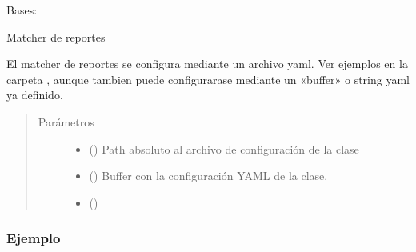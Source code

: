 \documentclass[a4paper,12pt,spanish]{sphinxmanual}
\begin{document}
\begin{fulllineitems}
\label{\detokenize{openerm.ReportMatcher:openerm.ReportMatcher.ReportMatcher}}
Bases: 

Matcher de reportes

El matcher de reportes se configura mediante un archivo yaml. Ver ejemplos
en la carpeta , aunque tambien puede configurarase mediante un «buffer»
o string yaml ya definido.
\begin{quote}\begin{description}
\item[{Parámetros}] \leavevmode\begin{itemize}
\item {} 
 () \textendash{} Path absoluto al archivo de configuración de la clase

\item {} 
 () \textendash{} Buffer con la configuración YAML de la clase.

\item {} 
 () \textendash{} 

\end{itemize}

\end{description}\end{quote}
\subsubsection*{Ejemplo}

\begin{sphinxVerbatim}[commandchars=\\\{\}]
   
  
\end{sphinxVerbatim}


\end{fulllineitems}
\end{document}

